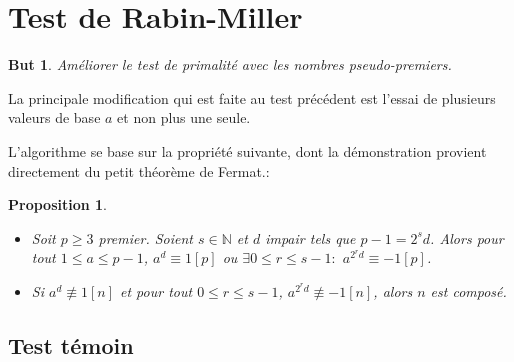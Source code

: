 \documentclass[10pt,a4paper]{report}
\newtheorem*{but}{But}
\newtheorem{Prop}[thm]{Proposition}
\begin{document}
\section{Test de Rabin-Miller}

\begin{but}Améliorer le test de primalité avec les nombres pseudo-premiers.
\end{but}

La principale modification qui est faite au test précédent est l'essai de plusieurs valeurs de base $a$ et non plus une seule.

L'algorithme se base sur la propriété suivante, dont la démonstration provient directement du petit théorème de Fermat.:

\begin{Prop}
\begin{itemize}
\item[•] Soit $p \geqslant 3$ premier. Soient $s \in \mathbb{N}$ et $d$ impair tels que $p-1=2^s d$. Alors pour tout $1 \leqslant a \leqslant p-1$, $a^d \equiv 1 [p]$ ou $\exists 0 \leqslant r \leqslant s-1:$ $a^{2^r d}\equiv -1 [p]$.
\item[•] Si $a^d \not \equiv 1 [n]$ et pour tout $0 \leqslant r \leqslant s-1$, $a^{2^r d} \not \equiv -1 [n]$, alors $n$ est composé. 
\end{itemize}
\end{Prop}

\subsection*{Test témoin}

\\
\end{document}
